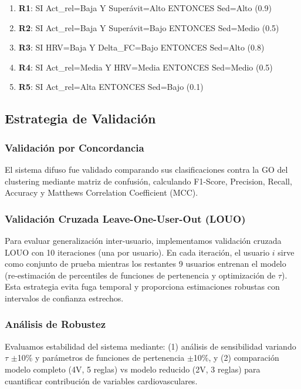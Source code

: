 \documentclass[journal,twoside,web]{ieeecolor}
\begin{document}
\begin{enumerate}
\item \textbf{R1}: SI Act\_rel=Baja Y Superávit=Alto ENTONCES Sed=Alto (0.9)
\item \textbf{R2}: SI Act\_rel=Baja Y Superávit=Bajo ENTONCES Sed=Medio (0.5)
\item \textbf{R3}: SI HRV=Baja Y Delta\_FC=Bajo ENTONCES Sed=Alto (0.8)
\item \textbf{R4}: SI Act\_rel=Media Y HRV=Media ENTONCES Sed=Medio (0.5)
\item \textbf{R5}: SI Act\_rel=Alta ENTONCES Sed=Bajo (0.1)
\end{enumerate}

\subsection{Estrategia de Validación}

\subsubsection{Validación por Concordancia}
El sistema difuso fue validado comparando sus clasificaciones contra la GO del clustering mediante matriz de confusión, calculando F1-Score, Precision, Recall, Accuracy y Matthews Correlation Coefficient (MCC).

\subsubsection{Validación Cruzada Leave-One-User-Out (LOUO)}
Para evaluar generalización inter-usuario, implementamos validación cruzada LOUO con 10 iteraciones (una por usuario). En cada iteración, el usuario $i$ sirve como conjunto de prueba mientras los restantes 9 usuarios entrenan el modelo (re-estimación de percentiles de funciones de pertenencia y optimización de $\tau$). Esta estrategia evita fuga temporal y proporciona estimaciones robustas con intervalos de confianza estrechos.

\subsubsection{Análisis de Robustez}
Evaluamos estabilidad del sistema mediante: (1) análisis de sensibilidad variando $\tau$ $\pm$10\% y parámetros de funciones de pertenencia $\pm$10\%, y (2) comparación modelo completo (4V, 5 reglas) vs modelo reducido (2V, 3 reglas) para cuantificar contribución de variables cardiovasculares.
\end{document}

